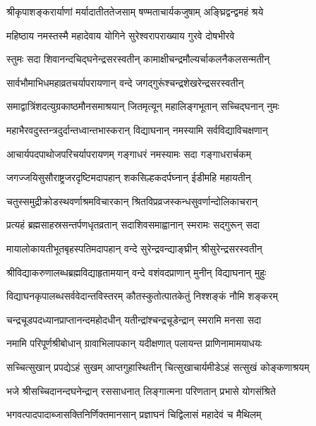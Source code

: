 \twolineshloka
{श्रीकृपाशङ्करार्याणां मर्यादातीततेजसाम्} 
{षण्मताचार्यकजुषाम् अङ्घ्रिद्वन्द्वमहं श्रये}%

\twolineshloka
{महिष्ठाय नमस्तस्मै महादेवाय योगिने} 
{सुरेश्वरापराख्याय गुरवे दोषभीरवे}%

\twolineshloka
{स्तुमः सदा शिवानन्दचिद्घनेन्द्रसरस्वतीन्} 
{कामाक्षीचन्द्रमौल्यर्चाकलनैकलसन्मतीन्}%

\twolineshloka
{सार्वभौमाभिधमहाव्रतचर्यापरायणान्} 
{वन्दे जगद्गुरूंश्चन्द्रशेखरेन्द्रसरस्वतीन्}%

\twolineshloka
{समाद्वात्रिंशदत्युग्रकाष्ठमौनसमाश्रयान्} 
{जितमृत्यून् महालिङ्गभूतान् सच्चिद्घनान् नुमः}%

\twolineshloka
{महाभैरवदुस्तन्त्रदुर्दान्तध्वान्तभास्करान्} 
{विद्याघनान् नमस्यामि सर्वविद्याविचक्षणान्}%

\twolineshloka
{आचार्यपदपाथोजपरिचर्यापरायणम्} 
{गङ्गाधरं नमस्यामः सदा गङ्गाधरार्चकम्}%

\twolineshloka
{जगज्जयिसुसौराष्ट्रजरदृष्टिमदापहान्} 
{शकसिल्हकदर्पघ्नान् ईडीमहि महायतीन्}%

\twolineshloka
{चतुस्समुद्रीक्रोडस्थवर्णाश्रमविचारकान्} 
{श्रितविप्रव्रजस्कन्धसुवर्णान्दोलिकाचरान्}%

\twolineshloka
{प्रत्यहं ब्रह्मसाहस्रसन्तर्पणधृतव्रतान्} 
{सदाशिवसमाह्वानान् स्मरामः सद्गुरून् सदा}%

\twolineshloka
{मायालोकायतीभूतबृहस्पतिमदापहान्} 
{वन्दे सुरेन्द्रवन्द्याङ्घ्रीन् श्रीसुरेन्द्रसरस्वतीन्}%

\twolineshloka
{श्रीविद्याकरुणालब्धब्रह्मविद्याहृतामयान्} 
{वन्दे वशंवदप्राणान् मुनीन् विद्याघनान् मुहुः}%

\twolineshloka
{विद्याघनकृपालब्धसर्ववेदान्तविस्तरम्} 
{कौतस्कुतोत्पातकेतुं निश्शङ्कं नौमि शङ्करम्}%

\twolineshloka
{चन्द्रचूडपदध्यानप्राप्तानन्दमहोदधीन्} 
{यतीन्द्रांश्चन्द्रचूडेन्द्रान् स्मरामि मनसा सदा}%

\twolineshloka
{नमामि परिपूर्णश्रीबोधान् ग्रावाभिलापकान्} 
{यदीक्षणात् पलायन्त प्राणिनामामयाधयः}%

\twolineshloka
{सच्चित्सुखान् प्रपद्येऽहं सुखम् आप्तगुहास्थितीन्} %
{चित्सुखाचार्यमीडेऽहं सत्सुखं कोङ्कणाश्रयम्} %

\twolineshloka
{भजे श्रीसच्चिदानन्दघनेन्द्रान् रससाधनात्} 
{लिङ्गात्मना परिणतान् प्रभासे योगसंश्रिते}%

\twolineshloka
{भगवत्पादपादाब्जासक्तिनिर्णिक्तमानसान्} 
{प्रज्ञाघनं चिद्विलासं महादेवं च मैथिलम्}%

